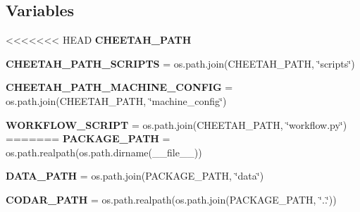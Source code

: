 \subsection*{Variables}
\begin{DoxyCompactItemize}
\item 
<<<<<<< HEAD
{\bfseries C\+H\+E\+E\+T\+A\+H\+\_\+\+P\+A\+TH}
\item 
\mbox{\label{namespacecodar_1_1cheetah_1_1config_a326d76d724a30795d5e2b25c59a1454a}} 
{\bfseries C\+H\+E\+E\+T\+A\+H\+\_\+\+P\+A\+T\+H\+\_\+\+S\+C\+R\+I\+P\+TS} = os.\+path.\+join(C\+H\+E\+E\+T\+A\+H\+\_\+\+P\+A\+TH, \char`\"{}scripts\char`\"{})
\item 
\mbox{\label{namespacecodar_1_1cheetah_1_1config_a5d735d6f2f43c555f2e137b38af7fc94}} 
{\bfseries C\+H\+E\+E\+T\+A\+H\+\_\+\+P\+A\+T\+H\+\_\+\+M\+A\+C\+H\+I\+N\+E\+\_\+\+C\+O\+N\+F\+IG} = os.\+path.\+join(C\+H\+E\+E\+T\+A\+H\+\_\+\+P\+A\+TH, \char`\"{}machine\+\_\+config\char`\"{})
\item 
\mbox{\label{namespacecodar_1_1cheetah_1_1config_a069e6b421b6b35917575637b5fe64409}} 
{\bfseries W\+O\+R\+K\+F\+L\+O\+W\+\_\+\+S\+C\+R\+I\+PT} = os.\+path.\+join(C\+H\+E\+E\+T\+A\+H\+\_\+\+P\+A\+TH, \char`\"{}workflow.\+py\char`\"{})
=======
\mbox{\label{namespacecodar_1_1cheetah_1_1config_ac3d4a0bd20d4e47ccdcd4ddb6303c1ab}} 
{\bfseries P\+A\+C\+K\+A\+G\+E\+\_\+\+P\+A\+TH} = os.\+path.\+realpath(os.\+path.\+dirname(\+\_\+\+\_\+file\+\_\+\+\_\+))
\item 
\mbox{\label{namespacecodar_1_1cheetah_1_1config_a87c807c2d48e4f9bb206c1d6afde26b5}} 
{\bfseries D\+A\+T\+A\+\_\+\+P\+A\+TH} = os.\+path.\+join(P\+A\+C\+K\+A\+G\+E\+\_\+\+P\+A\+TH, \char`\"{}data\char`\"{})
\item 
\mbox{\label{namespacecodar_1_1cheetah_1_1config_a4ee1eac654271fe0e95d5c67599937a1}} 
{\bfseries C\+O\+D\+A\+R\+\_\+\+P\+A\+TH} = os.\+path.\+realpath(os.\+path.\+join(P\+A\+C\+K\+A\+G\+E\+\_\+\+P\+A\+TH, \char`\"{}..\char`\"{}))
\item 
\mbox{\label{namespacecodar_1_1cheetah_1_1config_ae6c35df28d3aa0b6f7095d2d0c7d3dc8}} 

\end{DoxyCompactItemize}
